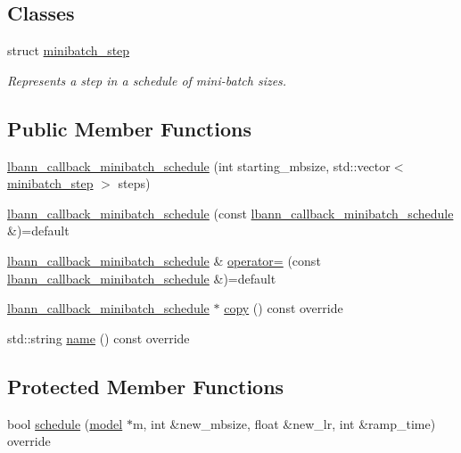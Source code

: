 \subsection*{Classes}
\begin{DoxyCompactItemize}
\item 
struct \hyperlink{structlbann_1_1lbann__callback__minibatch__schedule_1_1minibatch__step}{minibatch\+\_\+step}
\begin{DoxyCompactList}\small\item\em Represents a step in a schedule of mini-\/batch sizes. \end{DoxyCompactList}\end{DoxyCompactItemize}
\subsection*{Public Member Functions}
\begin{DoxyCompactItemize}
\item 
\hyperlink{classlbann_1_1lbann__callback__minibatch__schedule_adceb97a2732247213fd25b3f1e824105}{lbann\+\_\+callback\+\_\+minibatch\+\_\+schedule} (int starting\+\_\+mbsize, std\+::vector$<$ \hyperlink{structlbann_1_1lbann__callback__minibatch__schedule_1_1minibatch__step}{minibatch\+\_\+step} $>$ steps)
\item 
\hyperlink{classlbann_1_1lbann__callback__minibatch__schedule_a2b9849aed5002479815dc6372a544e80}{lbann\+\_\+callback\+\_\+minibatch\+\_\+schedule} (const \hyperlink{classlbann_1_1lbann__callback__minibatch__schedule}{lbann\+\_\+callback\+\_\+minibatch\+\_\+schedule} \&)=default
\item 
\hyperlink{classlbann_1_1lbann__callback__minibatch__schedule}{lbann\+\_\+callback\+\_\+minibatch\+\_\+schedule} \& \hyperlink{classlbann_1_1lbann__callback__minibatch__schedule_aed9c1240268ca4f2cd0d77f2f5a4ec3f}{operator=} (const \hyperlink{classlbann_1_1lbann__callback__minibatch__schedule}{lbann\+\_\+callback\+\_\+minibatch\+\_\+schedule} \&)=default
\item 
\hyperlink{classlbann_1_1lbann__callback__minibatch__schedule}{lbann\+\_\+callback\+\_\+minibatch\+\_\+schedule} $\ast$ \hyperlink{classlbann_1_1lbann__callback__minibatch__schedule_ad815c5e84280c71cc57c7cb6c9a8c73b}{copy} () const override
\item 
std\+::string \hyperlink{classlbann_1_1lbann__callback__minibatch__schedule_a2bb62cf45d2f7417cddcf79843ce3e2b}{name} () const override
\end{DoxyCompactItemize}
\subsection*{Protected Member Functions}
\begin{DoxyCompactItemize}
\item 
bool \hyperlink{classlbann_1_1lbann__callback__minibatch__schedule_af95cbe83a587590219174cb17828ea4b}{schedule} (\hyperlink{classlbann_1_1model}{model} $\ast$m, int \&new\+\_\+mbsize, float \&new\+\_\+lr, int \&ramp\+\_\+time) override
\end{DoxyCompactItemize}
